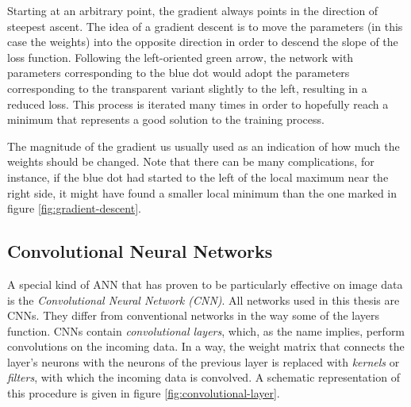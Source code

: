 \documentclass[11pt, a4paper]{article}
\begin{document}
Starting at an arbitrary point, the gradient always points in the direction of steepest ascent. The idea of a gradient descent is to move the parameters (in this case the weights) into the opposite direction in order to descend the slope of the loss function. Following the left-oriented green arrow, the network with parameters corresponding to the blue dot would adopt the parameters corresponding to the transparent variant slightly to the left, resulting in a reduced loss. This process is iterated many times in order to hopefully reach a minimum that represents a good solution to the training process.

The magnitude of the gradient us usually used as an indication of how much the weights should be changed. Note that there can be many complications, for instance, if the blue dot had started to the left of the local maximum near the right side, it might have found a smaller local minimum than the one marked in figure \ref{fig:gradient-descent}.


\subsection{Convolutional Neural Networks}
A special kind of ANN that has proven to be particularly effective on image data is the \emph{Convolutional Neural Network (CNN)}. All networks used in this thesis are CNNs. They differ from conventional networks in the way some of the layers function. CNNs contain \emph{convolutional layers}, which, as the name implies, perform convolutions on the incoming data. In a way, the weight matrix that connects the layer's neurons with the neurons of the previous layer is replaced with \emph{kernels} or \emph{filters}, with which the incoming data is convolved. A schematic representation of this procedure is given in figure \ref{fig:convolutional-layer}.
\end{document}

